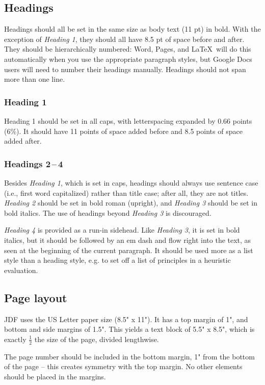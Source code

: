 \documentclass[
	letterpaper, %
]{jdf}
\begin{document}
\subsection{Headings}
Headings should all be set in the same size as body text (11 pt) in bold. With the exception of \emph{Heading 1}, they should all have 8.5 pt of space before and after. They should be hierarchically numbered: Word, Pages, and \LaTeX\ will do this automatically when you use the appropriate paragraph styles, but Google Docs users will need to number their headings manually. Headings should not span more than one line.

\subsubsection{Heading 1}
Heading 1 should be set in all caps, with letterspacing expanded by 0.66 points (6\%). It should have 11 points of space added before and 8.5 points of space added after.

\subsubsection{Headings 2\,–\,4}
Besides \emph{Heading 1}, which is set in caps, headings should always use sentence case (i.e., first word capitalized) rather than title case; after all, they are not titles. \emph{Heading 2} should be set in bold roman (upright), and \emph{Heading 3} should be set in bold italics. The use of headings beyond \emph{Heading 3} is discouraged.

\emph{Heading 4} is provided as a run-in sidehead. Like \emph{Heading 3}, it is set in bold italics, but it should be followed by an em dash and flow right into the text, as seen at the beginning of the current paragraph. It should be used more as a list style than a heading style, e.g. to set off a list of principles in a heuristic evaluation.

\subsection{Page layout}
JDF uses the US Letter paper size (8.5" x 11"). It has a top margin of 1", and bottom and side margins of 1.5". This yields a text block of 5.5" x 8.5", which is exactly \(\frac{1}{2}\) the size of the page, divided lengthwise.

The page number should be included in the bottom margin, 1" from the bottom of the page – this creates symmetry with the top margin. No other elements should be placed in the margins.
\end{document}

